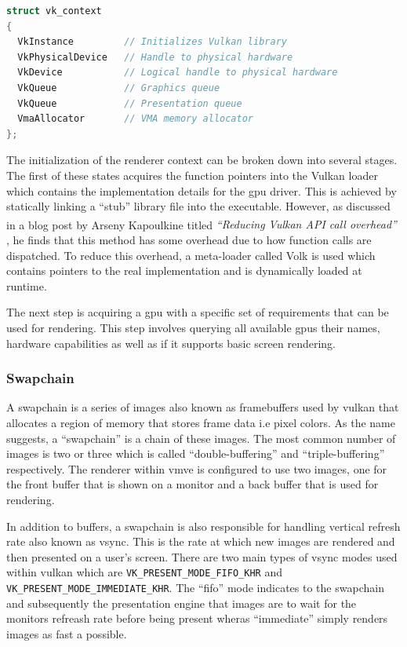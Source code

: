 \documentclass[11pt]{article}
\begin{document}
\begin{lstlisting}[language=C++]
struct vk_context
{
  VkInstance         // Initializes Vulkan library
  VkPhysicalDevice   // Handle to physical hardware
  VkDevice           // Logical handle to physical hardware
  VkQueue            // Graphics queue
  VkQueue            // Presentation queue
  VmaAllocator       // VMA memory allocator
};
\end{lstlisting}

The initialization of the renderer context can be broken down into several
stages. The first of these states acquires the function pointers into the Vulkan
loader which contains the implementation details for the \gls{gpu} driver. This
is achieved by statically linking a ``stub'' library file into the executable.
However, as discussed in a blog post by Arseny Kapoulkine titled
\textit{``Reducing Vulkan\textsuperscript{\textregistered} API call overhead''}
\cite{volk}, he finds that this method has some overhead due to how function
calls are dispatched. To reduce this overhead, a meta-loader called Volk is used
which contains pointers to the real implementation and is dynamically loaded at
runtime.

The next step is acquiring a \gls{gpu} with a specific set of requirements that
can be used for rendering. This step involves querying all available \glspl{gpu}
their names, hardware capabilities as well as if it supports basic screen
rendering.

\subsubsection{Swapchain}
A swapchain is a series of images also known as framebuffers used by
\gls{vulkan} that allocates a region of memory that stores frame data i.e pixel
colors. As the name suggests, a ``swapchain'' is a chain of these images. The
most common number of images is two or three which is called
``double-buffering'' and ``triple-buffering'' respectively. The renderer within
\gls{vmve} is configured to use two images, one for the front buffer that is shown
on a monitor and a back buffer that is used for rendering.

In addition to buffers, a swapchain is also responsible for handling vertical
refresh rate also known as vsync. This is the rate at which new images are
rendered and then presented on a user's screen. There are two main types of
vsync modes used within \gls{vulkan} which are
\lstinline{VK_PRESENT_MODE_FIFO_KHR} and
\lstinline{VK_PRESENT_MODE_IMMEDIATE_KHR}. The ``fifo'' mode indicates to the 
swapchain and subsequently the presentation engine that images are to wait 
for the monitors refreash rate before being present wheras ``immediate'' simply
renders images as fast a possible.
\end{document}
